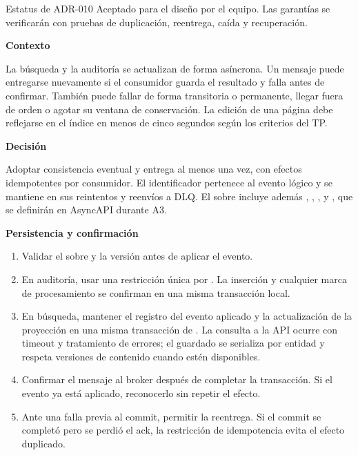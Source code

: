 \begin{adrbox}{Estatus de ADR-010}
Aceptado para el diseño por el equipo. Las garantías se verificarán con pruebas de duplicación, reentrega, caída y recuperación.
\end{adrbox}

\par\medskip\noindent\textbf{Contexto}\par\nobreak\smallskip

La búsqueda y la auditoría se actualizan de forma asíncrona. Un mensaje puede entregarse nuevamente si el consumidor guarda el resultado y falla antes de confirmar. También puede fallar de forma transitoria o permanente, llegar fuera de orden o agotar su ventana de conservación. La edición de una página debe reflejarse en el índice en menos de cinco segundos según los criterios del TP.

\par\medskip\noindent\textbf{Decisión}\par\nobreak\smallskip

Adoptar consistencia eventual y entrega al menos una vez, con efectos idempotentes por consumidor. El identificador  pertenece al evento lógico y se mantiene en sus reintentos y reenvíos a DLQ. El sobre incluye además , , ,  y , que se definirán en AsyncAPI durante A3.

\par\medskip\noindent\textbf{Persistencia y confirmación}\par\nobreak\smallskip

\begin{enumerate}[leftmargin=1.5em,itemsep=3pt]
\item Validar el sobre y la versión antes de aplicar el evento.
\item En auditoría, usar una restricción única por . La inserción y cualquier marca de procesamiento se confirman en una misma transacción local.
\item En búsqueda, mantener el registro del evento aplicado y la actualización de la proyección en una misma transacción de . La consulta a la API ocurre con timeout y tratamiento de errores; el guardado se serializa por entidad y respeta versiones de contenido cuando estén disponibles.
\item Confirmar el mensaje al broker después de completar la transacción. Si el evento ya está aplicado, reconocerlo sin repetir el efecto.
\item Ante una falla previa al commit, permitir la reentrega. Si el commit se completó pero se perdió el ack, la restricción de idempotencia evita el efecto duplicado.
\end{enumerate}

